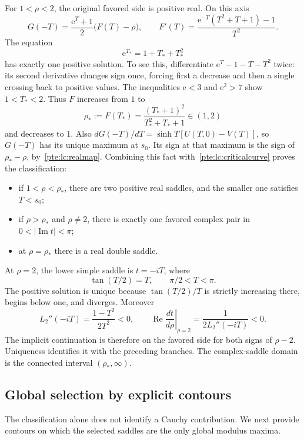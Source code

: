 \documentclass[11pt,a4paper]{article}
\numberwithin{equation}{section}
\theoremstyle{definition}
\theoremstyle{plain}
\newcommand{\ee}{\mathrm e}
\begin{document}
For $1<\rho<2$, the original favored side is positive real. On this axis
\begin{equation}\label{pte:lc:realmap}
 G(-T)=\frac{\ee^T+1}{2}\bigl(F(T)-\rho\bigr),\qquad
 F'(T)=\frac{\ee^{-T}(T^2+T+1)-1}{T^2}.
\end{equation}
The equation
\begin{equation}\label{pte:lc:fold}
 \ee^{T_*}=1+T_*+T_*^2
\end{equation}
has exactly one positive solution. To see this, differentiate $\ee^T-1-T-T^2$ twice: its second derivative changes sign once, forcing first a decrease and then a single crossing back to positive values. The inequalities $\ee<3$ and $\ee^2>7$ show $1<T_*<2$. Thus $F$ increases from $1$ to
\[
 \rho_*:=F(T_*)=\frac{(T_*+1)^2}{T_*^2+T_*+1}\in(1,2)
\]
and decreases to $1$. Also $dG(-T)/dT=\sinh T[U(T,0)-V(T)]$, so $G(-T)$ has its unique maximum at $s_0$. Its sign at that maximum is the sign of $\rho_*-\rho$, by~\eqref{pte:lc:realmap}. Combining this fact with~\eqref{pte:lc:criticalcurve} proves the classification:
\begin{itemize}
\item if $1<\rho<\rho_*$, there are two positive real saddles, and the smaller one satisfies $T<s_0$;
\item if $\rho>\rho_*$ and $\rho\ne2$, there is exactly one favored complex pair in $0<|\operatorname{Im}t|<\pi$;
\item at $\rho=\rho_*$ there is a real double saddle.
\end{itemize}
At $\rho=2$, the lower simple saddle is $t=-iT$, where
\begin{equation}\label{pte:lc:center}
 \tan(T/2)=T,\qquad \pi/2<T<\pi.
\end{equation}
The positive solution is unique because $\tan(T/2)/T$ is strictly increasing there, begins below one, and diverges. Moreover
\begin{equation}\label{pte:lc:branchsign}
 L_2''(-iT)=\frac{1-T^2}{2T^2}<0,\qquad
 \operatorname{Re}\left.\frac{dt}{d\rho}\right|_{\rho=2}
 =\frac1{2L_2''(-iT)}<0.
\end{equation}
The implicit continuation is therefore on the favored side for both signs of $\rho-2$. Uniqueness identifies it with the preceding branches. The complex-saddle domain is the connected interval $(\rho_*,\infty)$.

\subsection{Global selection by explicit contours}
The classification alone does not identify a Cauchy contribution. We next provide contours on which the selected saddles are the only global modulus maxima.
\end{document}
